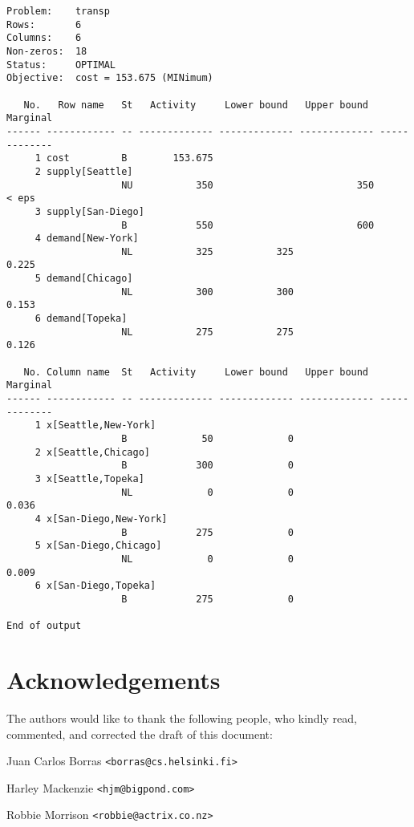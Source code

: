 \documentclass[11pt]{report}
\begin{document}
\begin{footnotesize}
\begin{verbatim}
Problem:    transp
Rows:       6
Columns:    6
Non-zeros:  18
Status:     OPTIMAL
Objective:  cost = 153.675 (MINimum)

   No.   Row name   St   Activity     Lower bound   Upper bound    Marginal
------ ------------ -- ------------- ------------- ------------- -------------
     1 cost         B        153.675
     2 supply[Seattle]
                    NU           350                         350         < eps
     3 supply[San-Diego]
                    B            550                         600
     4 demand[New-York]
                    NL           325           325                       0.225
     5 demand[Chicago]
                    NL           300           300                       0.153
     6 demand[Topeka]
                    NL           275           275                       0.126

   No. Column name  St   Activity     Lower bound   Upper bound    Marginal
------ ------------ -- ------------- ------------- ------------- -------------
     1 x[Seattle,New-York]
                    B             50             0
     2 x[Seattle,Chicago]
                    B            300             0
     3 x[Seattle,Topeka]
                    NL             0             0                       0.036
     4 x[San-Diego,New-York]
                    B            275             0
     5 x[San-Diego,Chicago]
                    NL             0             0                       0.009
     6 x[San-Diego,Topeka]
                    B            275             0

End of output
\end{verbatim}
\end{footnotesize}


\newpage

\section*{Acknowledgements}

The authors would like to thank the following people, who kindly read,
commented, and corrected the draft of this document:

\noindent Juan Carlos Borras \verb|<borras@cs.helsinki.fi>|

\noindent Harley Mackenzie \verb|<hjm@bigpond.com>|

\noindent Robbie Morrison \verb|<robbie@actrix.co.nz>|
\end{document}
